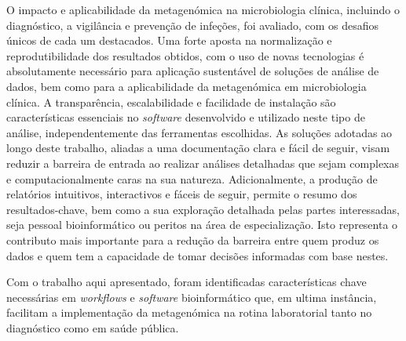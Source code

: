 O impacto e aplicabilidade da metagenómica na microbiologia clínica, incluindo o diagnóstico, a vigilância e prevenção de infeções, foi avaliado, com os desafios únicos de cada um destacados. Uma forte aposta na normalização e reprodutibilidade dos resultados obtidos, com o uso de novas tecnologias é absolutamente necessário para aplicação sustentável de soluções de análise de dados, bem como para a aplicabilidade da metagenómica em microbiologia clínica. A transparência, escalabilidade e facilidade de instalação são características essenciais no \textit{software} desenvolvido e utilizado neste tipo de análise, independentemente das ferramentas escolhidas. As soluções adotadas ao longo deste trabalho, aliadas a uma documentação clara e fácil de seguir, visam reduzir a barreira de entrada ao realizar análises detalhadas que sejam complexas e computacionalmente caras na sua natureza. Adicionalmente, a produção de relatórios intuitivos, interactivos e fáceis de seguir, permite o resumo dos resultados-chave, bem como a sua exploração detalhada pelas partes interessadas, seja pessoal bioinformático ou peritos na área de especialização. Isto representa o contributo mais importante para a redução da barreira entre quem produz os dados e quem tem a capacidade de tomar decisões informadas com base nestes. 

Com o trabalho aqui apresentado, foram identificadas características chave necessárias em \textit{workflows} e \textit{software} bioinformático que, em ultima instância, facilitam a implementação da metagenómica na rotina laboratorial tanto no diagnóstico como em saúde pública.

